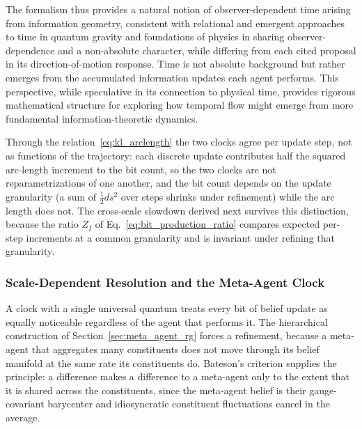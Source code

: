 \documentclass[11pt]{article}
\begin{document}
The formalism thus provides a natural notion of observer-dependent time arising from information geometry, consistent with relational and emergent approaches to time in quantum gravity and foundations of physics in sharing observer-dependence and a non-absolute character, while differing from each cited proposal in its direction-of-motion response. Time is not absolute background but rather emerges from the accumulated information updates each agent performs. This perspective, while speculative in its connection to physical time, provides rigorous mathematical structure for exploring how temporal flow might emerge from more fundamental information-theoretic dynamics.

Through the relation~\eqref{eq:kl_arclength} the two clocks agree per update step, not as functions of the trajectory: each discrete update contributes half the squared arc-length increment to the bit count, so the two clocks are not reparametrizations of one another, and the bit count depends on the update granularity (a sum of $\tfrac{1}{2}ds^2$ over steps shrinks under refinement) while the arc length does not. The cross-scale slowdown derived next survives this distinction, because the ratio $Z_I$ of Eq.~\eqref{eq:bit_production_ratio} compares expected per-step increments at a common granularity and is invariant under refining that granularity.

\subsubsection{Scale-Dependent Resolution and the Meta-Agent Clock}
\label{sec:scale_dependent_time}

A clock with a single universal quantum treats every bit of belief update as equally noticeable regardless of the agent that performs it. The hierarchical construction of Section~\ref{sec:meta_agent_rg} forces a refinement, because a meta-agent that aggregates many constituents does not move through its belief manifold at the same rate its constituents do. Bateson's criterion supplies the principle: a difference makes a difference to a meta-agent only to the extent that it is shared across the constituents, since the meta-agent belief is their gauge-covariant barycenter and idiosyncratic constituent fluctuations cancel in the average.
\end{document}
